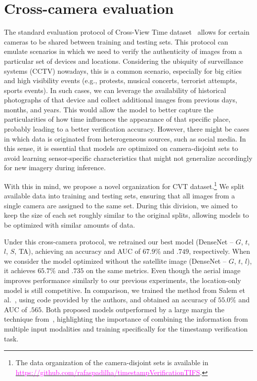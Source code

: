 \documentclass[journal]{IEEEtran}
\newcommand{\repoLink}[1]{\textcolor{magenta}{#1}}
\begin{document}
        
        
    

\section{Cross-camera evaluation}\label{sec:cross_camera}
    The standard evaluation protocol of Cross-View Time dataset~\cite{salem2020learning} allows for certain cameras to be shared between training and testing sets. This protocol can emulate scenarios in which we need to verify the authenticity of images from a particular set of devices and locations. Considering the ubiquity of surveillance systems (CCTV) nowadays, this is a common scenario, especially for big cities and high visibility events (e.g., protests, musical concerts, terrorist attempts, sports events). In such cases, we can leverage the availability of historical photographs of that device and collect additional images from previous days, months, and years. This would allow the model to better capture the particularities of how time influences the appearance of that specific place, probably leading to a better verification accuracy. However, there might be cases in which data is originated from heterogeneous sources, such as social media. In this sense, it is essential that models are optimized on camera-disjoint sets to avoid learning sensor-specific characteristics that might not generalize accordingly for new imagery during inference.
    
    With this in mind, we propose a novel organization for CVT dataset.\footnote{The data organization of the camera-disjoint sets is available in \href{https://github.com/rafaspadilha/timestampVerificationTIFS}{\repoLink{https://github.com/rafaspadilha/timestampVerificationTIFS}}.} We split available data into training and testing sets, ensuring that all images from a single camera are assigned to the same set. During this division, we aimed to keep the size of each set roughly similar to the original splits, allowing models to be optimized with similar amounts of data. 
    
    Under this cross-camera protocol, we retrained our best model (DenseNet -- $G$, $t$, $l$, $S$, TA), achieving an accuracy and AUC of $67.9\%$ and $.749$, respectively. When we consider the model optimized without the satellite image (DenseNet -- $G$, $t$, $l$), it achieves $65.7\%$ and $.735$ on the same metrics. Even though the aerial image improves performance similarly to our previous experiments, the location-only model is still competitive. In comparison, we trained the method from Salem et al.~\cite{salem2020learning}, using code provided by the authors, and obtained an accuracy of $55.0\%$ and AUC of $.565$. Both proposed models outperformed by a large margin the technique from~\cite{salem2020learning}, highlighting the importance of combining the information from multiple input modalities and training specifically for the timestamp verification task. 
    
\end{document}
